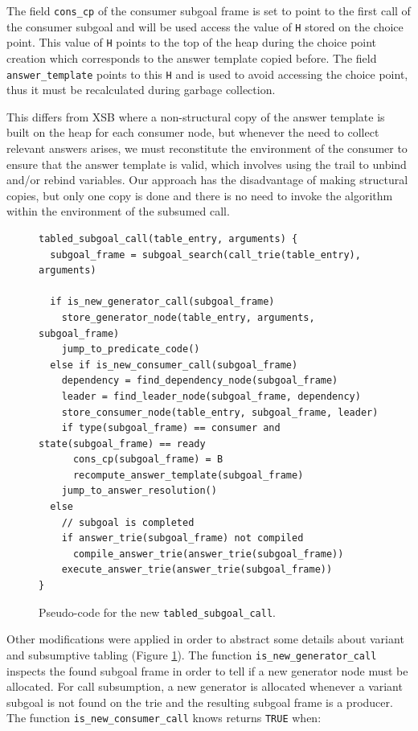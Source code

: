 The field \texttt{cons\_cp} of the consumer subgoal frame is set to point to the first call
of the consumer subgoal and will be used access the value of \texttt{H} stored on the choice point.
This value of \texttt{H} points to the top of the heap during the choice point creation which corresponds
to the answer template copied before. The field \texttt{answer\_template} points to this \texttt{H}
and is used to avoid accessing the choice point, thus it must be recalculated during garbage collection.

This differs from XSB \cite{XXX} where a non-structural copy of the answer template is built on the heap for each
consumer node, but whenever the need to collect relevant answers arises, we must reconstitute the
environment of the consumer to ensure that the answer template is valid, which involves using the trail
to unbind and/or rebind variables. Our approach has the disadvantage of making structural copies,
but only one copy is done and there is no need to invoke the algorithm
within the environment of the subsumed call.

\begin{figure}[ht]
\begin{Verbatim}
tabled_subgoal_call(table_entry, arguments) {
  subgoal_frame = subgoal_search(call_trie(table_entry), arguments)
  
  if is_new_generator_call(subgoal_frame)
    store_generator_node(table_entry, arguments, subgoal_frame)
    jump_to_predicate_code()
  else if is_new_consumer_call(subgoal_frame)
    dependency = find_dependency_node(subgoal_frame)
    leader = find_leader_node(subgoal_frame, dependency)
    store_consumer_node(table_entry, subgoal_frame, leader)
    if type(subgoal_frame) == consumer and state(subgoal_frame) == ready
      cons_cp(subgoal_frame) = B
      recompute_answer_template(subgoal_frame)
    jump_to_answer_resolution()
  else
    // subgoal is completed
    if answer_trie(subgoal_frame) not compiled
      compile_answer_trie(answer_trie(subgoal_frame))
    execute_answer_trie(answer_trie(subgoal_frame))
}
\end{Verbatim}
\caption{Pseudo-code for the new \texttt{tabled\_subgoal\_call}.}
\label{fig:tabled_subgoal_call_new}
\end{figure}

Other modifications were applied in order to abstract some details about
variant and subsumptive tabling (Figure \ref{fig:tabled_subgoal_call_new}).
The function \texttt{is\_new\_generator\_call} inspects the found
subgoal frame in order to tell if a new generator node must be allocated.
For call subsumption, a new generator is allocated whenever a variant subgoal is not found
on the trie and the resulting subgoal frame is a producer.
The function \texttt{is\_new\_consumer\_call} knows returns \texttt{TRUE} when:

